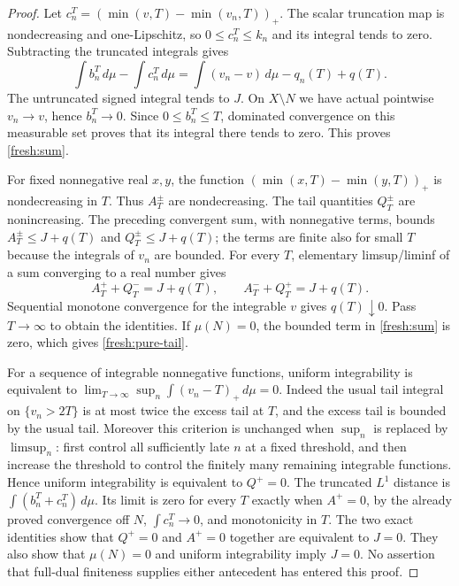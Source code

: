 \begin{proof}
Let $c_n^T=(\min(v,T)-\min(v_n,T))_+$. The scalar truncation map is
nondecreasing and one-Lipschitz, so $0\le c_n^T\le k_n$ and its
integral tends to zero. Subtracting the truncated integrals gives
\[
 \int b_n^T\,d\mu-\int c_n^T\,d\mu
 =\int(v_n-v)\,d\mu-q_n(T)+q(T).
\]
The untruncated signed integral tends to $J$. On $X\setminus N$ we
have actual pointwise $v_n\to v$, hence $b_n^T\to0$. Since
$0\le b_n^T\le T$, dominated convergence on this measurable set
proves that its integral there tends to zero. This proves
\eqref{fresh:sum}.

For fixed nonnegative real $x,y$, the function
$(\min(x,T)-\min(y,T))_+$ is nondecreasing in $T$. Thus $A_T^\pm$
are nondecreasing. The tail quantities $Q_T^\pm$ are nonincreasing.
The preceding convergent sum, with nonnegative terms, bounds
$A_T^\pm\le J+q(T)$ and $Q_T^\pm\le J+q(T)$; the terms are finite
also for small $T$ because the integrals of $v_n$ are bounded.
For every $T$, elementary limsup/liminf of a sum converging to a real
number gives
\[
 A_T^++Q_T^-=J+q(T),\qquad A_T^-+Q_T^+=J+q(T).
\]
Sequential monotone convergence for the integrable $v$ gives
$q(T)\downarrow0$. Pass $T\to\infty$ to obtain the identities.
If $\mu(N)=0$, the bounded term in \eqref{fresh:sum} is zero, which
gives \eqref{fresh:pure-tail}.

For a sequence of integrable nonnegative functions, uniform
integrability is equivalent to
$\lim_{T\to\infty}\sup_n\int(v_n-T)_+\,d\mu=0$.
Indeed the usual tail integral on $\{v_n>2T\}$ is at most twice the
excess tail at $T$, and the excess tail is bounded by the usual tail.
Moreover this criterion is unchanged when $\sup_n$ is replaced by
$\limsup_n$: first control all sufficiently late $n$ at a fixed
threshold, and then increase the threshold to control the finitely
many remaining integrable functions. Hence uniform integrability is
equivalent to $Q^+=0$.
The truncated $L^1$ distance is
$\int(b_n^T+c_n^T)\,d\mu$. Its limit is zero for every $T$ exactly
when $A^+=0$, by the already proved convergence off $N$,
$\int c_n^T\to0$, and monotonicity in $T$. The two exact identities
show that $Q^+=0$ and $A^+=0$ together are equivalent to $J=0$.
They also show that $\mu(N)=0$ and uniform integrability imply $J=0$.
No assertion that full-dual finiteness supplies either antecedent has
entered this proof.
\end{proof}

